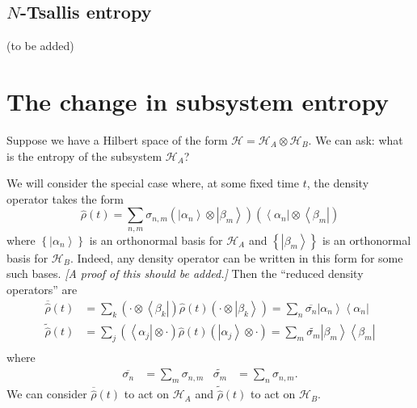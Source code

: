 \documentclass[11pt]{article}
\newcommand{\bra}[1]{\left\langle#1\right|}
\newcommand{\ket}[1]{\left|#1\right\rangle}
\newcommand{\hilb}{\mathcal{H}}
\newcommand{\op}[1]{\hat{#1}}
\theoremstyle{theorem}
\theoremstyle{remark}
\theoremstyle{step}
\theoremstyle{gap}
\begin{document}
\subsection{\(N\)-Tsallis entropy}

(to be added)


\section{The change in subsystem entropy}

Suppose we have a Hilbert space of the form \(\hilb = \hilb_A \otimes \hilb_B\). We can ask: what is the entropy of the subsystem \(\hilb_A\)?

We will consider the special case where, at some fixed time \(t\), the density operator takes the form
\begin{equation}\label{eq.densdecompred}
\op{\rho}(t) = \sum_{n,m} \sigma_{n,m} \left(\ket{\alpha_n}\otimes\ket{\beta_m}\right)\left(\bra{\alpha_n}\otimes\bra{\beta_m}\right) 
\end{equation}
where \(\left\{\ket{\alpha_n}\right\}\) is an orthonormal basis for \(\hilb_A\) and \(\left\{\ket{\beta_m}\right\}\) is an orthonormal basis for \(\hilb_B\). Indeed, any density operator can be written in this form for some such bases. \emph{[A proof of this should be added.]}
Then the ``reduced density operators'' are
\begin{align*}
\overline{\op{\rho}}(t)
&= \sum_k \left(\cdot\otimes\bra{\beta_k}\right) \op{\rho}(t) \left(\cdot\otimes\ket{\beta_k}\right) 
= \sum_n \overline{\sigma_n} \ket{\alpha_n}\bra{\alpha_n} \\
\widetilde{\op{\rho}}(t)
&= \sum_j \left(\bra{\alpha_j}\otimes\cdot\right) \op{\rho}(t) \left(\ket{\alpha_j}\otimes\cdot\right) 
= \sum_m \widetilde{\sigma_m} \ket{\beta_m}\bra{\beta_m} \\
\end{align*}
where
\begin{align*}
\overline{\sigma_n} &= \sum_m \sigma_{n,m} &
\widetilde{\sigma_m} &= \sum_n \sigma_{n,m}.
\end{align*}
We can consider \(\overline{\op{\rho}}(t)\) to act on \(\hilb_A\) and \(\widetilde{\op{\rho}}(t)\) to act on \(\hilb_B\).
\end{document}
